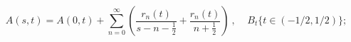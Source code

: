 \begin{equation}
A(s,t)=A(0,t)+
\sum_{n=0}^\infty
\left(
\frac{r_n(t)}{s-n-\frac{1}{2}}+\frac{r_n(t)}{n+\frac{1}{2}}
\right)\ , \ \ \ \ \
B_t \{ t \in (-1/2,1/2) \} ;
\label{a1}
\end{equation}

